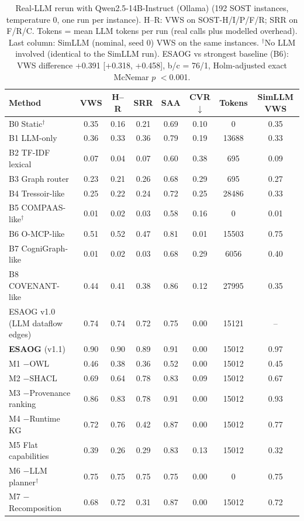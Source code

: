 \begin{table}[H]
\centering
\caption{Real-LLM rerun with Qwen2.5-14B-Instruct (Ollama) (192 SOST instances, temperature 0, one run per instance). H--R: VWS on SOST-H/I/P/F/R; SRR on F/R/C. Tokens = mean LLM tokens per run (real calls plus modelled overhead). Last column: SimLLM (nominal, seed 0) VWS on the same instances. $^\dagger$No LLM involved (identical to the SimLLM run). ESAOG vs strongest baseline (B6): VWS difference +0.391 [+0.318, +0.458], b/c = 76/1, Holm-adjusted exact McNemar $p$ $<$0.001.}
\label{tab:real_qwen25-14b}
\scriptsize
\begin{tabular}{lccccccc}
\toprule
Method & VWS & H--R & SRR & SAA & CVR$\downarrow$ & Tokens & SimLLM VWS\\
\midrule
B0 Static$^\dagger$ & 0.35 & 0.16 & 0.21 & 0.69 & 0.10 & 0 & 0.35\\
B1 LLM-only & 0.36 & 0.33 & 0.36 & 0.79 & 0.19 & 13688 & 0.33\\
B2 TF-IDF lexical & 0.07 & 0.04 & 0.07 & 0.60 & 0.38 & 695 & 0.09\\
B3 Graph router & 0.23 & 0.21 & 0.26 & 0.68 & 0.29 & 695 & 0.27\\
B4 Tressoir-like & 0.25 & 0.22 & 0.24 & 0.72 & 0.25 & 28486 & 0.33\\
B5 COMPAAS-like$^\dagger$ & 0.01 & 0.02 & 0.03 & 0.58 & 0.16 & 0 & 0.01\\
B6 O-MCP-like & 0.51 & 0.52 & 0.47 & 0.81 & 0.01 & 15503 & 0.75\\
B7 CogniGraph-like & 0.01 & 0.02 & 0.03 & 0.68 & 0.29 & 6056 & 0.40\\
B8 COVENANT-like & 0.44 & 0.41 & 0.38 & 0.86 & 0.12 & 27995 & 0.35\\
ESAOG v1.0 (LLM dataflow edges) & 0.74 & 0.74 & 0.72 & 0.75 & 0.00 & 15121 & --\\
\textbf{ESAOG} (v1.1) & 0.90 & 0.90 & 0.89 & 0.91 & 0.00 & 15012 & 0.97\\
M1 $-$OWL & 0.46 & 0.38 & 0.36 & 0.52 & 0.00 & 15012 & 0.45\\
M2 $-$SHACL & 0.69 & 0.64 & 0.78 & 0.83 & 0.09 & 15012 & 0.67\\
M3 $-$Provenance ranking & 0.86 & 0.83 & 0.78 & 0.91 & 0.00 & 15012 & 0.93\\
M4 $-$Runtime KG & 0.72 & 0.76 & 0.42 & 0.87 & 0.00 & 15012 & 0.77\\
M5 Flat capabilities & 0.39 & 0.26 & 0.29 & 0.83 & 0.13 & 15012 & 0.32\\
M6 $-$LLM planner$^\dagger$ & 0.75 & 0.75 & 0.75 & 0.75 & 0.00 & 0 & 0.75\\
M7 $-$Recomposition & 0.68 & 0.72 & 0.31 & 0.87 & 0.00 & 15012 & 0.72\\
\bottomrule
\end{tabular}
\end{table}
